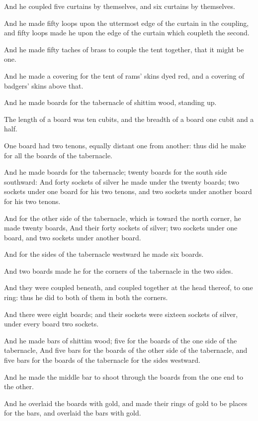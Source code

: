 \verse And he coupled five curtains by themselves, and six curtains by themselves.

\verse And he made fifty loops upon the uttermost edge of the curtain in the coupling, and fifty loops made he upon the edge of the curtain which coupleth the second.

\verse And he made fifty taches of brass to couple the tent together, that it might be one.

\verse And he made a covering for the tent of rams' skins dyed red, and a covering of badgers' skins above that.

\verse And he made boards for the tabernacle of shittim wood, standing up.

\verse The length of a board was ten cubits, and the breadth of a board one cubit and a half.

\verse One board had two tenons, equally distant one from another: thus did he make for all the boards of the tabernacle.

\verse And he made boards for the tabernacle; twenty boards for the south side southward: \verse And forty sockets of silver he made under the twenty boards; two sockets under one board for his two tenons, and two sockets under another board for his two tenons.

\verse And for the other side of the tabernacle, which is toward the north corner, he made twenty boards, \verse And their forty sockets of silver; two sockets under one board, and two sockets under another board.

\verse And for the sides of the tabernacle westward he made six boards.

\verse And two boards made he for the corners of the tabernacle in the two sides.

\verse And they were coupled beneath, and coupled together at the head thereof, to one ring: thus he did to both of them in both the corners.

\verse And there were eight boards; and their sockets were sixteen sockets of silver, under every board two sockets.

\verse And he made bars of shittim wood; five for the boards of the one side of the tabernacle, \verse And five bars for the boards of the other side of the tabernacle, and five bars for the boards of the tabernacle for the sides westward.

\verse And he made the middle bar to shoot through the boards from the one end to the other.

\verse And he overlaid the boards with gold, and made their rings of gold to be places for the bars, and overlaid the bars with gold.

